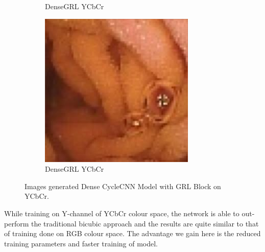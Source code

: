 \begin{figure}[H]
\begin{subfigure}[b]{0.32\textwidth}
    \caption{DenseGRL YCbCr}
  \end{subfigure}
  \begin{subfigure}[b]{0.32\textwidth}
    \includegraphics[width=\textwidth]{Chapter7/Ycbcr_cycle_dense_456.jpg}
    \caption{DenseGRL YCbCr}
  \end{subfigure}
    
    \caption[Images generated Dense CycleCNN Model with GRL Block on YCbCr.]{Images generated Dense CycleCNN Model with GRL Block on YCbCr.}
    \label{fig:label7.3}
\end{figure}

While training on Y-channel of YCbCr colour space, the network is able to out-perform the traditional bicubic approach and the results are quite similar to that of training done on RGB colour space. The advantage we gain here is the reduced training parameters and faster training of model.


